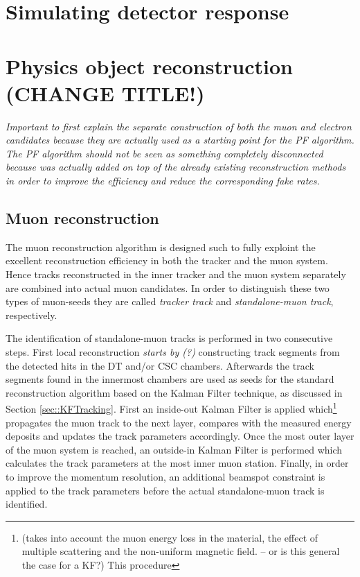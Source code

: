 \section{Simulating detector response} \label{sec::DetectorSim} %

\section{Physics object reconstruction (CHANGE TITLE!)} \label{sec::PhysicsObjects}

\textit{Important to first explain the separate construction of both the muon and electron candidates because they are actually used as a starting point for the PF algorithm. The PF algorithm should not be seen as something completely disconnected because was actually added on top of the already existing reconstruction methods in order to improve the efficiency and reduce the corresponding fake rates.}

\subsection{Muon reconstruction}\label{subsec::Muon}

The muon reconstruction algorithm is designed such to fully exploint the excellent reconstruction efficiency in both the tracker and the muon system.
Hence tracks reconstructed in the inner tracker and the muon system separately are combined into actual muon candidates. In order to distinguish these two types of muon-seeds they are called \textit{tracker track} and \textit{standalone-muon track}, respectively.

The identification of standalone-muon tracks is performed in two consecutive steps. First local reconstruction \textit{starts by (?)} constructing track segments from the detected hits in the DT and/or CSC chambers. Afterwards the track segments found in the innermost chambers are used as seeds for the standard reconstruction algorithm based on the Kalman Filter technique, as discussed in Section \ref{sec::KFTracking}. First an inside-out Kalman Filter is applied which\footnote{ (takes into account the muon energy loss in the material, the effect of multiple scattering and the non-uniform magnetic field. -- or is this general the case for a KF?) This procedure} propagates the muon track to the next layer, compares with the measured energy deposits and updates the track parameters accordingly. Once the most outer layer of the muon system is reached, an outside-in Kalman Filter is performed which calculates the track parameters at the most inner muon station. Finally, in order to improve the momentum resolution, an additional beamspot constraint is applied to the track parameters before the actual standalone-muon track is identified.

